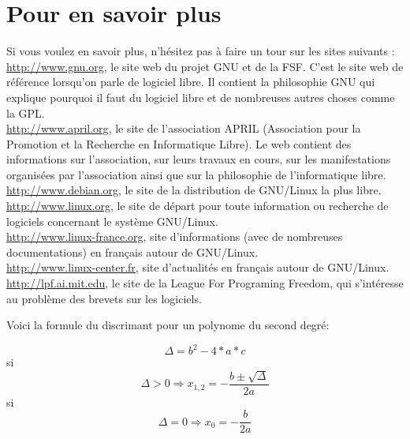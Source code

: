 \documentclass{article}
\begin{document}
\newpage

\section{Pour en savoir plus}
Si vous voulez en savoir plus, n'hésitez pas à faire un tour sur les sites suivants : \vspace{5mm} \\
\url{http://www.gnu.org}, le site web du projet GNU et de la FSF. C'est le site web de référence lorsqu'on parle de logiciel libre. Il contient la philosophie GNU qui explique pourquoi il faut du logiciel libre et de nombreuses autres choses comme la GPL. \vspace{5mm} \\
\url{http://www.april.org}, le site de l'association APRIL (Association pour la Promotion et la Recherche en Informatique Libre). Le web contient des informations sur l'association, sur leurs travaux en cours, sur les manifestations organisées par l'association ainsi que sur la philosophie de l'informatique libre. \vspace{5mm} \\
\url{http://www.debian.org}, le site de la distribution de GNU/Linux la plus libre. \vspace{5mm} \\
\url{http://www.linux.org}, le site de départ pour toute information ou recherche de logiciels concernant le système GNU/Linux. \vspace{5mm} \\
\url{http://www.linux-france.org}, site d'informations (avec de nombreuses documentations) en français autour de GNU/Linux. \vspace{5mm} \\
\url{http://www.linux-center.fr}, site d'actualités en français autour de GNU/Linux. \vspace{5mm} \\
\url{http://lpf.ai.mit.edu}, le site de la League For Programing Freedom, qui s'intéresse au problème des brevets sur les logiciels.

\newpage

Voici la formule du discrimant pour un polynome du second degré:

\begin{equation}
    \Delta = b^2-4*a*c
\end{equation}
si 
\begin{equation}
    \Delta > 0 \Rightarrow x_{1,2} = -\frac{b\pm\sqrt{\Delta}}{2a}
\end{equation}
si
\begin{equation}
    \Delta = 0 \Rightarrow x_0 = -\frac{b}{2a}
\end{equation}
\end{document}
